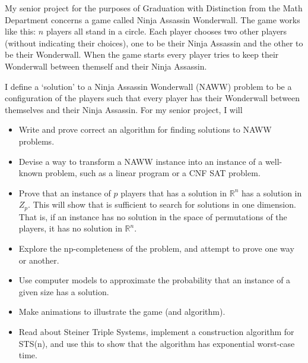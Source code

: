 \documentclass{article}
\begin{document}
My senior project for the purposes of Graduation with Distinction from the Math Department concerns a game called Ninja Assassin Wonderwall. The game works like this: $n$ players all stand in a circle. Each player chooses two other players  (without indicating their choices), one to be their Ninja Assassin and the other to be their Wonderwall. When the game starts every player tries to keep their Wonderwall between themself and their Ninja Assassin. 

I define a `solution' to a Ninja Assassin Wonderwall (NAWW) problem to be a configuration of the players such that every player has their Wonderwall between themselves and their Ninja Assassin. For my senior project, I will 

\begin{itemize}
    \item Write and prove correct an algorithm for finding solutions to NAWW problems.
    \item Devise a way to transform a NAWW instance into an instance of a well-known problem, such as a linear program or a CNF SAT problem.
    \item Prove that an instance of $p$ players that has a solution in $\mathbb{R}^n$ has a solution in $Z_p$. This will show that is sufficient to search for solutions in one dimension. That is, if an instance has no solution in the space of permutations of the players, it has no solution in $\mathbb{R}^n$.
    \item Explore the np-completeness of the problem, and attempt to prove one way or another.
    \item Use computer models to approximate the probability that an instance of a given size has a solution.
    \item Make animations to illustrate the game (and algorithm).
    \item Read about Steiner Triple Systems, implement a construction algorithm for STS(n), and use this to show that the algorithm has exponential worst-case time.
\end{itemize}
\end{document}
